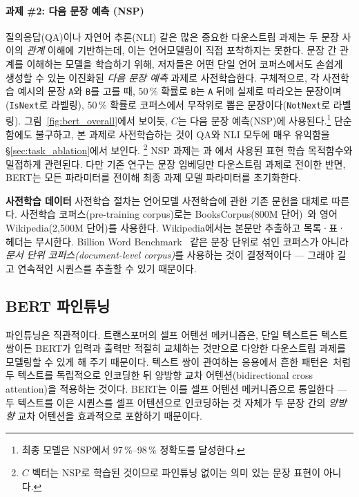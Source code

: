 \paragraph{과제 \#2: 다음 문장 예측 (NSP)}
질의응답(QA)이나 자연어 추론(NLI) 같은 많은 중요한 다운스트림 과제는 두 문장 사이의 \emph{관계} 이해에 기반하는데, 이는 언어모델링이 직접 포착하지는 못한다. 문장 간 관계를 이해하는 모델을 학습하기 위해, 저자들은 어떤 단일 언어 코퍼스에서도 손쉽게 생성할 수 있는 이진화된 \emph{다음 문장 예측} 과제로 사전학습한다. 구체적으로, 각 사전학습 예시의 문장 {\tt A}와 {\tt B}를 고를 때, 50\,\% 확률로 {\tt B}는 {\tt A} 뒤에 실제로 따라오는 문장이며({\tt {\small IsNext}}로 라벨링), 50\,\% 확률로 코퍼스에서 무작위로 뽑은 문장이다({\tt {\small NotNext}}로 라벨링).
그림~\ref{fig:bert_overall}에서 보이듯, $C$는 다음 문장 예측(NSP)에 사용된다.\footnote{최종 모델은 NSP에서 97\,\%--98\,\% 정확도를 달성한다.} 단순함에도 불구하고, 본 과제로 사전학습하는 것이 QA와 NLI 모두에 매우 유익함을 \S\ref{sec:task_ablation}에서 보인다.
\footnote{$C$ 벡터는 NSP로 학습된 것이므로 파인튜닝 없이는 의미 있는 문장 표현이 아니다.}
NSP 과제는 \citet{DBLP:journals/corr/JerniteBS17}과 \citet{logeswaran2018an}에서 사용된 표현 학습 목적함수와 밀접하게 관련된다. 다만 기존 연구는 문장 임베딩만 다운스트림 과제로 전이한 반면, BERT는 모든 파라미터를 전이해 최종 과제 모델 파라미터를 초기화한다.



\vspace{.3cm}
\noindent\textbf{사전학습 데이터}
사전학습 절차는 언어모델 사전학습에 관한 기존 문헌을 대체로 따른다. 사전학습 코퍼스(pre-training corpus)로는 BooksCorpus(800M 단어)~\cite{zhu:2015}와 영어 Wikipedia(2,500M 단어)를 사용한다. Wikipedia에서는 본문만 추출하고 목록·표·헤더는 무시한다. Billion Word Benchmark~\cite{chelba-etal:2013:_one} 같은 문장 단위로 섞인 코퍼스가 아니라 \emph{문서 단위 코퍼스(document-level corpus)}를 사용하는 것이 결정적이다 — 그래야 길고 연속적인 시퀀스를 추출할 수 있기 때문이다.

\subsection{BERT 파인튜닝}
\label{sec:finetuning_procedure}

파인튜닝은 직관적이다. 트랜스포머의 셀프 어텐션 메커니즘은, 단일 텍스트든 텍스트 쌍이든 BERT가 입력과 출력만 적절히 교체하는 것만으로 다양한 다운스트림 과제를 모델링할 수 있게 해 주기 때문이다.
텍스트 쌍이 관여하는 응용에서 흔한 패턴은~처럼 두 텍스트를 독립적으로 인코딩한 뒤 양방향 교차 어텐션(bidirectional cross attention)을 적용하는 것이다. BERT는 이를 셀프 어텐션 메커니즘으로 통일한다 — 두 텍스트를 이은 시퀀스를 셀프 어텐션으로 인코딩하는 것 자체가 두 문장 간의 \emph{양방향} 교차 어텐션을 효과적으로 포함하기 때문이다.


